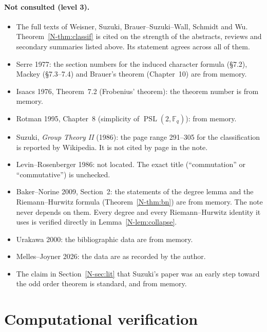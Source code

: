 \documentclass[12pt,letterpaper]{article}
\newcommand{\F}{\mathbb{F}}
\DeclareMathOperator{\PSL}{PSL}
\begin{document}
\paragraph{Not consulted (level 3).}
\begin{itemize}[itemsep=1pt]
\item The full texts of Weisner, Suzuki, Brauer--Suzuki--Wall, Schmidt and
  Wu. Theorem~\ref{N-thm:classif} is cited on the strength of the abstracts,
  reviews and secondary summaries listed above. Its statement agrees across
  all of them.
\item Serre 1977: the section numbers for the induced character formula
  (\S7.2), Mackey (\S7.3--7.4) and Brauer's theorem (Chapter~10) are from
  memory.
\item Isaacs 1976, Theorem~7.2 (Frobenius' theorem): the theorem number is
  from memory.
\item Rotman 1995, Chapter~8 (simplicity of $\PSL(2,\F_q)$): from memory.
\item Suzuki, \emph{Group Theory II} (1986): the page range 291--305 for the
  classification is reported by Wikipedia. It is not cited by page in the
  note.
\item Levin--Rosenberger 1986: not located. The exact title (``commutation''
  or ``commutative'') is unchecked.
\item Baker--Norine 2009, Section~2: the statements of the degree lemma and
  the Riemann--Hurwitz formula (Theorem~\ref{N-thm:bn}) are from memory.
  The note never depends on them. Every degree and every Riemann--Hurwitz
  identity it uses is verified directly in Lemma~\ref{N-lem:collapse}.
\item Urakawa 2000: the bibliographic data are from memory.
\item Melles--Joyner 2026: the data are as recorded by the author.
\item The claim in Section~\ref{N-sec:lit} that Suzuki's paper was an early
  step toward the odd order theorem is standard, and from memory.
\end{itemize}

\section{Computational verification}\label{sec:computations}
\end{document}
